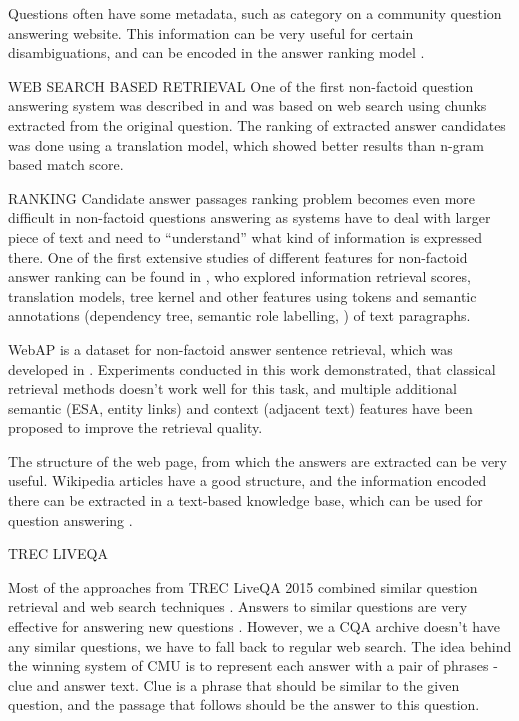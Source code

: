 Questions often have some metadata, such as category on a community question answering website.
This information can be very useful for certain disambiguations, and can be encoded in the answer ranking model \cite{zhou2015learning}.

WEB SEARCH BASED RETRIEVAL
One of the first non-factoid question answering system was described in \cite{soricut2006automatic} and was based on web search using chunks extracted from the original question.
The ranking of extracted answer candidates was done using a translation model, which showed better results than n-gram based match score.


RANKING
Candidate answer passages ranking problem becomes even more difficult in non-factoid questions answering as systems have to deal with larger piece of text and need to ``understand'' what kind of information is expressed there.
One of the first extensive studies of different features for non-factoid answer ranking can be found in \cite{surdeanu2011learning}, who explored information retrieval scores, translation models, tree kernel and other features using tokens and semantic annotations (dependency tree, semantic role labelling, \etc) of text paragraphs.

WebAP is a dataset for non-factoid answer sentence retrieval, which was developed in \cite{yang2016beyond}.
Experiments conducted in this work demonstrated, that classical retrieval methods doesn't work well for this task, and multiple additional semantic (ESA, entity links) and context (adjacent text) features have been proposed to improve the retrieval quality.

The structure of the web page, from which the answers are extracted can be very useful.
Wikipedia articles have a good structure, and the information encoded there can be extracted in a text-based knowledge base, which can be used for question answering \cite{sondhi2014mining}.

TREC LIVEQA

Most of the approaches from TREC LiveQA 2015 combined similar question retrieval and web search techniques \cite{ecnucs_liveqa15,savenkov_liveqa15,diwant_liveqa15}.
Answers to similar questions are very effective for answering new questions \cite{savenkov_liveqa15}.
However, we a CQA archive doesn't have any similar questions, we have to fall back to regular web search.
The idea behind the winning system of CMU \cite{diwant_liveqa15} is to represent each answer with a pair of phrases - clue and answer text.
Clue is a phrase that should be similar to the given question, and the passage that follows should be the answer to this question.

